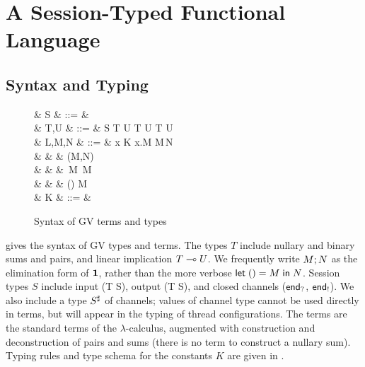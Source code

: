 \documentclass[oribibl,orivec,envcountsame]{llncs}
\begin{document}
\section{A Session-Typed Functional Language}\label{sec:gv}

\subsection{Syntax and Typing}\label{sec:gv-static}

\begin{figure}[t]
\begin{syntax}
   & S & ::= &  \mid {} \mid \interm \mid \outterm \mid {} \\
   & T,U & ::= & S \mid T \gvtimes U \mid \one \mid T \gvplus U \mid \zero \mid T \lto U
  \\ %
   & L,M,N & ::= & x \mid K \mid \lambda x.M \mid M\,N \\
  & & \mid & (M,N) \mid {} \\
  & & \mid & \,M \mid {}\,M \mid {} \\
  & & \mid & () \mid {} \mid {} \app M \\
   & K & ::= &  \mid {} \mid {} \mid {} \mid {}\\
\end{syntax}
\caption{Syntax of GV terms and types}\label{fig:gv-syntax}
\end{figure}

 gives the syntax of GV types and terms.  The types $T$ include nullary and binary
sums and pairs, and linear implication $T \multimap U$.  We frequently write $M; N$ as the
elimination form of $\mathbf{1}$, rather than the more verbose $\mathsf{let}\;() = M\;\mathsf{in}\;N$.  Session types $S$
include input (\gvin T S), output (\gvout T S), and closed channels ($\mathsf{end}_?$, $\mathsf{end}_!$).  We
also include a type $S^\sharp$ of channels; values of channel type cannot be used directly in
terms, but will appear in the typing of thread configurations.  The terms are the standard terms of
the $\lambda$-calculus, augmented with construction and deconstruction of pairs and sums (there is
no term to construct a nullary sum).  Typing rules and type schema for the constants $K$ are given
in .
\end{document}
